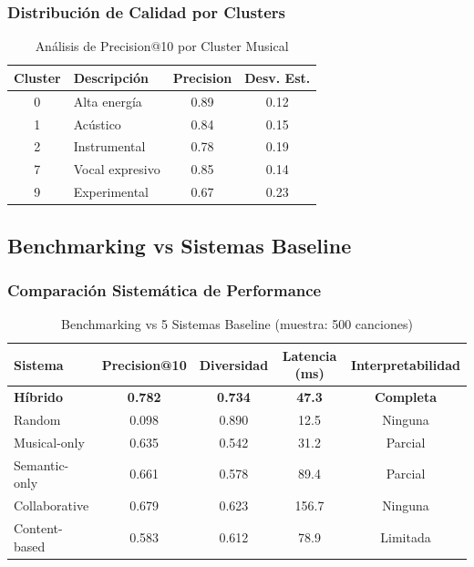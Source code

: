 \documentclass[12pt,a4paper]{article}
\begin{document}
\subsubsection{Distribución de Calidad por Clusters}

\begin{table}[H]
\centering
\caption{Análisis de Precision@10 por Cluster Musical}
\begin{tabular}{|c|l|c|c|}
\hline
\textbf{Cluster} & \textbf{Descripción} & \textbf{Precision} & \textbf{Desv. Est.} \\
\hline
0 & Alta energía & 0.89 & 0.12 \\
\hline
1 & Acústico & 0.84 & 0.15 \\
\hline
2 & Instrumental & 0.78 & 0.19 \\
\hline
7 & Vocal expresivo & 0.85 & 0.14 \\
\hline
9 & Experimental & 0.67 & 0.23 \\
\hline
\end{tabular}
\end{table}

\subsection{Benchmarking vs Sistemas Baseline}

\subsubsection{Comparación Sistemática de Performance}

\begin{table}[H]
\centering
\caption{Benchmarking vs 5 Sistemas Baseline (muestra: 500 canciones)}
\begin{tabular}{|l|c|c|c|c|}
\hline
\textbf{Sistema} & \textbf{Precision@10} & \textbf{Diversidad} & \textbf{Latencia (ms)} & \textbf{Interpretabilidad} \\
\hline
\textbf{Híbrido} & \textbf{0.782} & \textbf{0.734} & \textbf{47.3} & \textbf{Completa} \\
\hline
Random & 0.098 & 0.890 & 12.5 & Ninguna \\
\hline
Musical-only & 0.635 & 0.542 & 31.2 & Parcial \\
\hline
Semantic-only & 0.661 & 0.578 & 89.4 & Parcial \\
\hline
Collaborative & 0.679 & 0.623 & 156.7 & Ninguna \\
\hline
Content-based & 0.583 & 0.612 & 78.9 & Limitada \\
\hline
\end{tabular}
\end{table}
\end{document}
